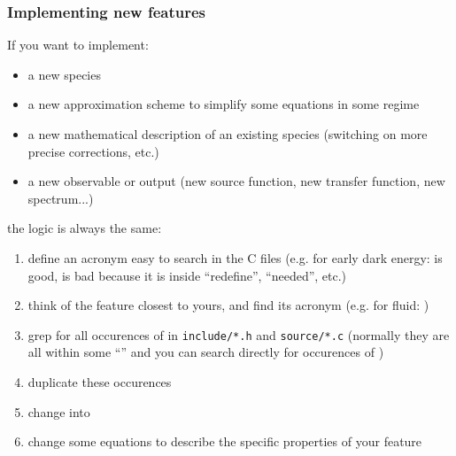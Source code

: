 \begin{frame}[fragile]
\frametitle{Implementing new features}

If you want to implement:
\begin{itemize}
\item a new species
\item a new approximation scheme to simplify some equations in some regime
\item a new mathematical description of an existing species (switching on more precise corrections, etc.)
\item a new observable or output (new source function, new transfer function, new spectrum...)
\end{itemize}
the logic is always the same:
\pause
\begin{enumerate}
\item define an acronym easy to search in the C files (e.g. for early dark energy:  is good,  is bad because it is inside ``redefine'', ``needed'', etc.)
\pause
\item think of the feature closest to yours, and find its acronym (e.g. for fluid: )
\pause
\item grep for all occurences of  in {\tt  include/*.h} and {\tt source/*.c} (normally they are all within some ``'' and you can search directly for occurences of )
\pause
\item duplicate these occurences
\pause
\item change  into  
\pause
\item change some equations to describe the specific properties of your feature
\end{enumerate}
\end{frame}




